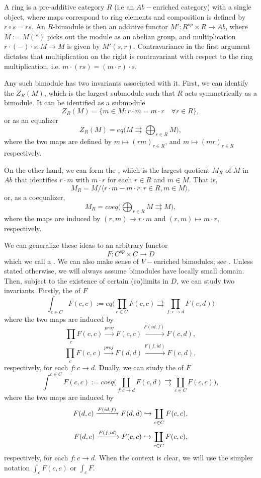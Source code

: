 A ring is a pre-additive category $R$ (i.e an $Ab-$enriched category) with a single object, where maps correspond to ring elements and composition is defined by $r\circ s=rs$. An $R$-bimodule is then an additive functor $M':R^{op}\times R\rightarrow Ab$, where $M:=M(*)$ picks out the module as an abelian group, and multiplication $r\cdot(-)\cdot s:M\rightarrow M$ is given by $M'(s,r)$. Contravariance in the first argument dictates that multiplication on the right is contravariant with respect to the ring multiplication, i.e. $m\cdot (rs)=(m\cdot r)\cdot s$. 

Any such bimodule has two invariants associated with it. First, we can identify the  $Z_R(M)$, which is the largest submodule such that $R$ acts symmetrically as a bimodule. It can be identified as a submodule
$$Z_R(M)=\{m\in M:r\cdot m=m\cdot r \quad \forall r\in R\},$$
or as an equalizer
$$Z_R(M)=eq\big(M\rightrightarrows \bigoplus_{r\in R} M\big),$$
where the two maps are defined by $m\mapsto (rm)_{r\in R}$, and $m\mapsto (mr)_{r\in R}$ respectively.

On the other hand, we can form the , which is the largest quotient $M_R$ of $M$ in $Ab$ that identifies $r\cdot m$ with $m\cdot r$ for each $r\in R$ and $m\in M$. That is, $$M_R=M/\langle r\cdot m-m\cdot r: r \in R, m\in M\rangle,$$ or, as a coequalizer,
$$M_R=coeq\big(\bigoplus_{r\in R} M\rightrightarrows M\big),$$
where the maps are induced by $(r,m)\mapsto r\cdot m$ and $(r,m)\mapsto m\cdot r$, respectively. 

We can generalize these ideas to an arbitrary functor  $$F:C^{op}\times C\rightarrow D$$ which we call a . We can also make sense of $V-$enriched bimodules; see \cite{Loregian21}. Unless stated otherwise, we will always assume bimodules have locally small domain. Then, subject to the existence of certain (co)limits in $D$, we can study two invariants. Firstly, the  of $F$
$$\int_{c\in C} F(c,c):=eq\Big(\prod_{c\in C}F(c,c)\rightrightarrows \prod_{f:c\rightarrow d} F(c,d)\Big)$$
where the two maps are induced by
$$\prod_c F(c,c)\xrightarrow[]{proj} F(c,c)\xrightarrow[]{F(id,f)}F(c,d),$$
$$\prod_c F(c,c)\xrightarrow[]{proj} F(d,d)\xrightarrow[]{F(f,id)}F(c,d),$$
respectively, for each $f:c\rightarrow d$. Dually, we can study the  of $F$
$$\int^{c\in C} F(c,c):=coeq\Big(\coprod_{f:c\rightarrow d}F(c,d)\rightrightarrows \coprod_{c\in C} F(c,c)\Big),$$
where the two maps are induced by
$$F(d,c)\xrightarrow[]{F(id,f)}F(d,d)\xhookrightarrow{}\coprod_{c\in C} F(c,c),$$
$$F(d,c)\xrightarrow[]{F(f,id)}F(c,c)\xhookrightarrow{}\coprod_{c\in C} F(c,c),$$
respectively, for each $f:c\rightarrow d$. When the context is clear, we will use the simpler notation $\int_c F(c,c)$ or $\int_c F$.

